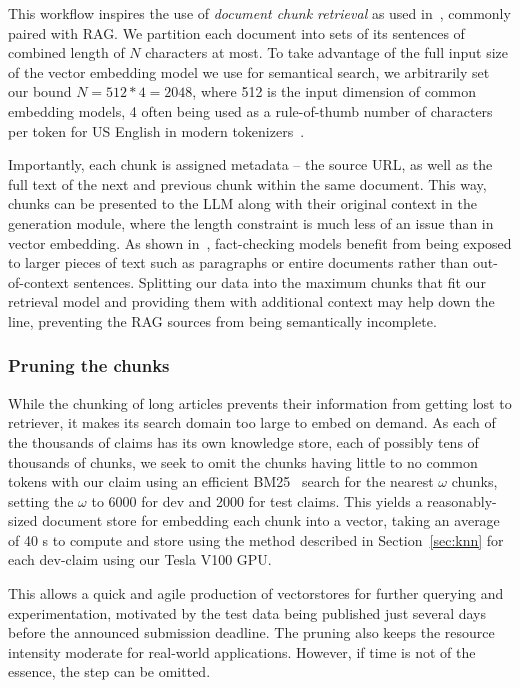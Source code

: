 This workflow inspires the use of \textit{document chunk retrieval} as used in~\cite{rag}, commonly paired with RAG.
We partition each document into sets of its sentences of combined length of $N$ characters at most.
To take advantage of the full input size of the vector embedding model we use for semantical search, we {arbitrarily} set our bound $N=512*4=2048$, {where 512 is} the input dimension of common embedding models, 4 often being used as a rule-of-thumb number of characters per token for US English in modern tokenizers~\cite{tokens}.

Importantly, each chunk is  assigned metadata -- the source URL, as well as the full text of the next and previous chunk within the same document.
This way, chunks can be presented to the LLM along with their original context in the generation module, where the length constraint is much less of an issue than in vector embedding.
As shown in~\cite{drchal2023pipelinedatasetgenerationautomated}, fact-checking models benefit from being exposed to larger pieces of text such as paragraphs or entire documents rather than out-of-context sentences.
Splitting our data into the maximum chunks that fit our retrieval model and providing them with additional context may help down the line, preventing the RAG sources from being semantically incomplete.

\subsubsection{Pruning the chunks}
While the chunking of long articles prevents their information from getting lost to retriever, it makes its search domain too large to embed on demand.
As each of the thousands of claims has its own knowledge store, each of possibly tens of thousands of chunks, we seek to omit the chunks having little to no common tokens with our claim using an efficient BM25~\cite{bm25} search for the nearest $\omega$ chunks, setting the $\omega$ to 6000 for dev and 2000 for test claims. 
This yields a reasonably-sized document store for embedding each chunk into a vector, taking an average of 40 s to compute and store using the method described in Section~\ref{sec:knn} for each dev-claim using our Tesla V100 GPU.

This allows a quick and agile production of vectorstores for further querying and experimentation, motivated by the \averitec{}  test data being published just several days before the announced submission deadline.
{The pruning also keeps the resource intensity moderate for real-world applications.
However, if time is not of the essence, the step can be omitted.}

